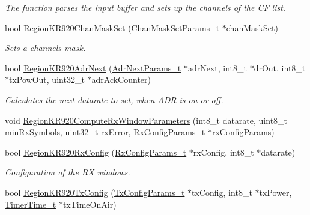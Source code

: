 \begin{DoxyCompactItemize}
\begin{DoxyCompactList}\small\item\em The function parses the input buffer and sets up the channels of the CF list. \end{DoxyCompactList}\item 
bool \mbox{\hyperlink{group___r_e_g_i_o_n_k_r920_gaf936d129f52abf7d56602258dece3f9f}{Region\+K\+R920\+Chan\+Mask\+Set}} (\mbox{\hyperlink{group___r_e_g_i_o_n_ga6d24f7da136006410827dfb29f6b9b9e}{Chan\+Mask\+Set\+Params\+\_\+t}} $\ast$chan\+Mask\+Set)
\begin{DoxyCompactList}\small\item\em Sets a channels mask. \end{DoxyCompactList}\item 
bool \mbox{\hyperlink{group___r_e_g_i_o_n_k_r920_gaf2fd635d699d384cf9e4342a583c5b8d}{Region\+K\+R920\+Adr\+Next}} (\mbox{\hyperlink{group___r_e_g_i_o_n_ga567c2742622326b350b4e91bbf61b4ce}{Adr\+Next\+Params\+\_\+t}} $\ast$adr\+Next, int8\+\_\+t $\ast$dr\+Out, int8\+\_\+t $\ast$tx\+Pow\+Out, uint32\+\_\+t $\ast$adr\+Ack\+Counter)
\begin{DoxyCompactList}\small\item\em Calculates the next datarate to set, when A\+DR is on or off. \end{DoxyCompactList}\item 
void \mbox{\hyperlink{group___r_e_g_i_o_n_k_r920_ga051e60df35d85cbf2e4089bbd8fd6290}{Region\+K\+R920\+Compute\+Rx\+Window\+Parameters}} (int8\+\_\+t datarate, uint8\+\_\+t min\+Rx\+Symbols, uint32\+\_\+t rx\+Error, \mbox{\hyperlink{group___r_e_g_i_o_n_ga375c038078dfcfc7ef14280021db719e}{Rx\+Config\+Params\+\_\+t}} $\ast$rx\+Config\+Params)
\item 
bool \mbox{\hyperlink{group___r_e_g_i_o_n_k_r920_gaef3bb50f109ca60815986e3559a32acc}{Region\+K\+R920\+Rx\+Config}} (\mbox{\hyperlink{group___r_e_g_i_o_n_ga375c038078dfcfc7ef14280021db719e}{Rx\+Config\+Params\+\_\+t}} $\ast$rx\+Config, int8\+\_\+t $\ast$datarate)
\begin{DoxyCompactList}\small\item\em Configuration of the RX windows. \end{DoxyCompactList}\item 
bool \mbox{\hyperlink{group___r_e_g_i_o_n_k_r920_gaa6c50a19f3f9238b8e296d74295059e3}{Region\+K\+R920\+Tx\+Config}} (\mbox{\hyperlink{group___r_e_g_i_o_n_gabed730d4d04b0b60d4b6d1966d3f21d3}{Tx\+Config\+Params\+\_\+t}} $\ast$tx\+Config, int8\+\_\+t $\ast$tx\+Power, \mbox{\hyperlink{utilities_8h_a4215ca43d3e953099ea758ce428599d0}{Timer\+Time\+\_\+t}} $\ast$tx\+Time\+On\+Air)

\end{DoxyCompactItemize}
